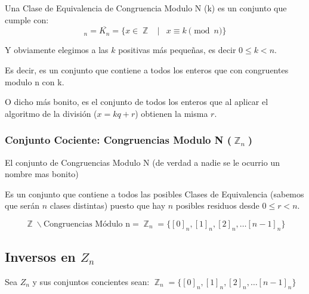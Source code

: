 \documentclass[12pt, fleqn]{report}                             %
\DeclareMathOperator \Space {\quad}                             %
\DeclareMathOperator \MiniSpace {\;}                            %
\newcommand \Such {\MiniSpace|\MiniSpace}                       %
\DeclareMathOperator \Integers  {\mathbb{Z}}                     %
\begin{document}
                Una Clase de Equivalencia de Congruencia Modulo N (k) es un conjunto
                que cumple con:
                \begin{equation}
                    [k]_n = \overline{K_n} = \{ x \in \Integers \Such x \equiv k \pmod{n} \}
                \end{equation}

                Y obviamente elegimos a las $k$ positivas más pequeñas, es decir 
                $0 \leq k < n$.

                Es decir, es un conjunto que contiene a todos los enteros que con
                congruentes modulo n con k.

                O dicho más bonito, es el conjunto de todos los enteros que al aplicar
                el algoritmo de la división ($x = kq+r$) obtienen la misma $r$.\\

            \subsubsection*{Conjunto Cociente: Congruencias Modulo N ($\Integers_n$)}

                El conjunto de Congruencias Modulo N (de verdad a nadie se le ocurrio 
                un nombre mas bonito)  

                Es  un conjunto que contiene a todos las posibles Clases de Equivalencia
                (sabemos que serán $n$ clases distintas) puesto que hay $n$ posibles residuos
                desde $0 \leq r < n$.

                \begin{equation}
                    \Integers \backslash \text{Congruencias Módulo n} = 
                        \Integers_n = \{ [0]_n , [1]_n, [2]_n, \dots  [n-1]_n\}
                \end{equation}



        \clearpage
        \subsection{Inversos en $Z_n$}

            Sea $Z_n$ y sus conjuntos concientes sean:
            $\Integers_n = \{ [0]_n , [1]_n, [2]_n, \dots  [n-1]_n\}$
\end{document}

